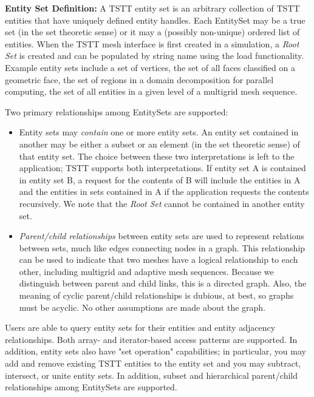 {\bf Entity Set Definition:} A TSTT entity set is an arbitrary
collection of TSTT entities that have uniquely defined entity handles.
Each EntitySet may be a true set (in the set theoretic sense) or it
may a (possibly non-unique) ordered list of entities.  When the TSTT
mesh interface is first created in a simulation, a {\it Root Set} is
created and can be populated by string name using the load
functionality.  Example entity sets include a set of vertices, the set
of all faces classified on a geometric face, the set of regions in a
domain decomposition for parallel computing, the set of all entities
in a given level of a multigrid mesh sequence.

Two primary relationships among EntitySets are supported:

\begin{itemize}
\item Entity sets may {\it contain} one or more entity sets.  An
entity set contained in another may be either a subset or an element
(in the set theoretic sense) of that entity set.  The choice between
these two interpretations is left to the application; TSTT supports
both interpretations. If entity set A is contained in entity set B, a
request for the contents of B will include the entities in A and the
entities in sets contained in A if the application requests the
contents recursively.  We note that the {\it Root Set} cannot be
contained in another entity set.

\item {\it Parent/child relationships} between entity sets are used to
represent relations between sets, much like edges connecting nodes in
a graph.  This relationship can be used to indicate that two meshes
have a logical relationship to each other, including multigrid and
adaptive mesh sequences. Because we distinguish between parent and
child links, this is a directed graph. Also, the meaning of cyclic
parent/child relationships is dubious, at best, so graphs must be
acyclic. No other assumptions are made about the graph.
\end{itemize}

Users are able to query entity sets for their entities and entity
adjacency relationships.  Both array- and iterator-based access
patterns are supported.  In addition, entity sets also have "set
operation" capabilities; in particular, you may add and remove
existing TSTT entities to the entity set and you may subtract,
intersect, or unite entity sets.  In addition, subset and hierarchical
parent/child relationships among EntitySets are supported.

